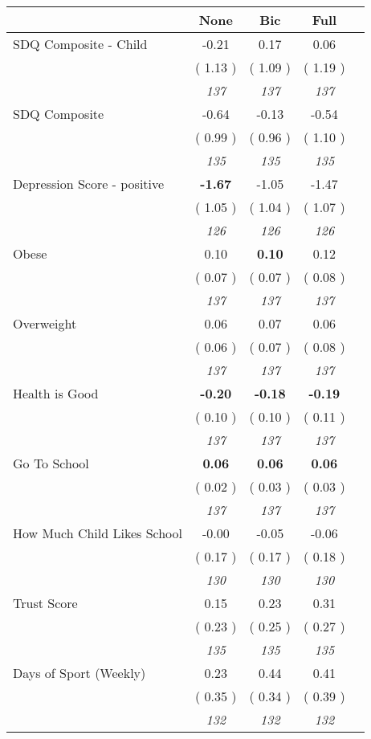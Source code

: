 \begin{tabular}{l c c c c}
\toprule
 & None & Bic & Full \\
\midrule
SDQ Composite - Child &     -0.21 &      0.17 &      0.06 \\
& (     1.13 ) & (     1.09 ) & (     1.19 ) \\
& \textit{ 137 } & \textit{ 137 } & \textit{ 137 } \\
SDQ Composite &     -0.64 &     -0.13 &     -0.54 \\
& (     0.99 ) & (     0.96 ) & (     1.10 ) \\
& \textit{ 135 } & \textit{ 135 } & \textit{ 135 } \\
Depression Score - positive & \textbf{     -1.67 } &     -1.05 &     -1.47 \\
& (     1.05 ) & (     1.04 ) & (     1.07 ) \\
& \textit{ 126 } & \textit{ 126 } & \textit{ 126 } \\
Obese &      0.10 & \textbf{      0.10 } &      0.12 \\
& (     0.07 ) & (     0.07 ) & (     0.08 ) \\
& \textit{ 137 } & \textit{ 137 } & \textit{ 137 } \\
Overweight &      0.06 &      0.07 &      0.06 \\
& (     0.06 ) & (     0.07 ) & (     0.08 ) \\
& \textit{ 137 } & \textit{ 137 } & \textit{ 137 } \\
Health is Good & \textbf{     -0.20 } & \textbf{     -0.18 } & \textbf{     -0.19 } \\
& (     0.10 ) & (     0.10 ) & (     0.11 ) \\
& \textit{ 137 } & \textit{ 137 } & \textit{ 137 } \\
Go To School & \textbf{      0.06 } & \textbf{      0.06 } & \textbf{      0.06 } \\
& (     0.02 ) & (     0.03 ) & (     0.03 ) \\
& \textit{ 137 } & \textit{ 137 } & \textit{ 137 } \\
How Much Child Likes School &     -0.00 &     -0.05 &     -0.06 \\
& (     0.17 ) & (     0.17 ) & (     0.18 ) \\
& \textit{ 130 } & \textit{ 130 } & \textit{ 130 } \\
Trust Score &      0.15 &      0.23 &      0.31 \\
& (     0.23 ) & (     0.25 ) & (     0.27 ) \\
& \textit{ 135 } & \textit{ 135 } & \textit{ 135 } \\
Days of Sport (Weekly) &      0.23 &      0.44 &      0.41 \\
& (     0.35 ) & (     0.34 ) & (     0.39 ) \\
& \textit{ 132 } & \textit{ 132 } & \textit{ 132 } \\
\bottomrule
\end{tabular}
